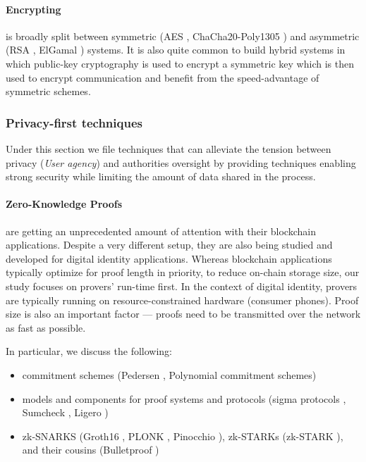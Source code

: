 \paragraph{Encrypting} 
\label{sp:encrypting}
is broadly split between symmetric (AES \cite{NIST2001AES}, ChaCha20-Poly1305 \cite{RFC7539}) and asymmetric (RSA \cite{RSA78}, ElGamal \cite{E85}) systems. It is also quite common to build hybrid systems in which public-key cryptography is used to encrypt a symmetric key which is then used to encrypt communication and benefit from the speed-advantage of symmetric schemes.

\subsubsection{Privacy-first techniques} 

Under this section we file techniques that can alleviate the tension between privacy (\emph{User agency}) and authorities oversight by providing techniques enabling strong security while limiting the amount of data shared in the process.

\paragraph{Zero-Knowledge Proofs} are getting an unprecedented amount of attention with their blockchain applications. 
Despite a very different setup, they are also being studied and developed for digital identity applications.
Whereas blockchain applications typically optimize for proof length in priority, to reduce on-chain storage size, our study focuses on provers' run-time first. In the context of digital identity, provers are typically running on resource-constrained hardware (consumer phones). Proof size is also an important factor --- proofs need to be transmitted over the network as fast as possible.  

In particular, we discuss the following:

\begin{itemize}
    \item commitment schemes (Pedersen \cite{PD91}, Polynomial commitment schemes)
    \item models and components for proof systems and protocols (sigma protocols \cite{SP90}, Sumcheck \cite{LCF92}, Ligero \cite{AHIV22})
    \item zk-SNARKS (Groth16 \cite{G16}, PLONK \cite{GWC90}, Pinocchio \cite{PHGR13}), zk-STARKs (zk-STARK \cite{BCG18}), and their cousins (Bulletproof \cite{BBD18})
\end{itemize}

